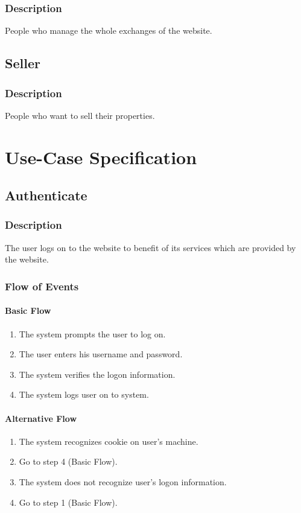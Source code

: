 \documentclass[a4paper,12pt]{article}
\begin{document}
\subsubsection{Description}
People who manage the whole exchanges of the website.

\subsection{Seller}
\subsubsection{Description}
People who want to sell their properties.


\section{Use-Case Specification}

\subsection{Authenticate}
\subsubsection{Description}
The user logs on to the website to benefit of its services which are provided by the website.
\subsubsection{Flow of Events}
\paragraph{Basic Flow}
\begin{enumerate}
\item The system prompts the user to log on.
\item The user enters his username and password.
\item The system verifies the logon information.
\item The system logs user on to system.
\end{enumerate}
\paragraph{Alternative Flow}
\begin{enumerate}
\item The system recognizes cookie on user's machine. 
\item Go to step 4 (Basic Flow).
\item The system does not recognize user's logon information.
\item Go to step 1 (Basic Flow).
\end{enumerate}
\end{document}
